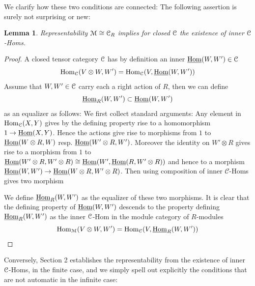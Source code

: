 \documentclass[a4paper, reqno]{amsart}
\newtheorem{lemma}[theorem]{Lemma}
\theoremstyle{introTheorems}
\newcommand\cC{\mathcal{C}}
\newcommand\Hom{\textup{Hom}}
\renewcommand{\1}{\mathbbold{1}}
\begin{document}
We clarify how these two conditions are connected: The following assertion is surely not surprising or new:

\begin{lemma}
Representability $\mathcal{M}\cong \mathcal{C}_R$  implies for closed $\mathcal{C}$ the existence of inner $\mathcal{C}$-Homs.
\end{lemma}
\begin{proof}
    A closed tensor category $\mathcal{C}$ has by definition an inner $\underline{\Hom}(W,W')\in \catC$  
$$\Hom_\catC(V\otimes W,W')
=\Hom_\catC(V,\underline{\Hom}(W,W'))$$
Assume that $W,W'\in \mathcal{C}$ carry each a right action of $R$, then we can define 
$$\underline{\Hom}_R(W,W')\subset \underline{\Hom}(W,W')$$ 
as an equalizer as follows: We first collect standard arguments: Any element in $\Hom_\catC(X,Y)$ gives by the defining property rise to a homomorphism $1\to \underline{\Hom}(X,Y)$. Hence the actions give rise to morphisms from $1$ to $\underline{\Hom}(W\otimes R ,W)$ resp. $\underline{\Hom}(W'\otimes R ,W')$. Moreover the identity on $W'\otimes R$ gives rise to a morphism from $1$ to $\underline{\Hom}(W'\otimes R,W'\otimes R)\cong \underline{\Hom}(W',\underline{\Hom}(R,W'\otimes R))$ and hence to a morphism 
$\underline{\Hom}(W,W')\to \underline{\Hom}(W\otimes R,W'\otimes R)$. Then using composition of inner $\cC$-Homs gives two morphism

\begin{center}
\end{center}
\bigskip

We define $\underline{\Hom}_R(W,W')$ as the equalizer of these two morphisms. It is clear that the defining property of $\underline{\Hom}(W,W')$ descends to the property defining $\underline{\Hom}_R(W,W')$ as the inner $\mathcal{C}$-Hom in the module category of $R$-modules
$$\Hom_\catM(V\otimes W,W')
=\Hom_\catC(V,\underline{\Hom}_R(W,W'))$$
\end{proof}

Conversely, \cite{DSPS19} Section 2 establishes the representability from the existence of inner $\mathcal{C}$-Homs, in the finite case, and we simply spell out explicitly the conditions that are not automatic in the infinite case:
\end{document}
